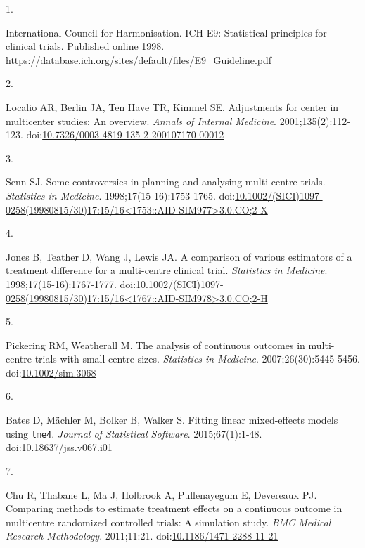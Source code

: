 \documentclass[
  11pt,
]{article}
\newlength{\cslhangindent}
\newlength{\csllabelwidth}
\newenvironment{CSLReferences}[2] %
 {\begin{list}{}{%
  \setlength{\itemindent}{0pt}
  \setlength{\leftmargin}{0pt}
  \setlength{\parsep}{0pt}
  \ifodd #1
   \setlength{\leftmargin}{\cslhangindent}
   \setlength{\itemindent}{-1\cslhangindent}
  \fi
  \setlength{\itemsep}{#2\baselineskip}}}
 {\end{list}}
\newcommand{\CSLLeftMargin}[1]{\parbox[t]{\csllabelwidth}{\strut#1\strut}}
\newcommand{\CSLRightInline}[1]{\parbox[t]{\linewidth - \csllabelwidth}{\strut#1\strut}}
\begin{document}
\protect{}\label{refs}
\begin{CSLReferences}{0}{1}
\CSLLeftMargin{1. }%
\CSLRightInline{International Council for Harmonisation. ICH {E9}: Statistical principles for clinical trials. Published online 1998. \url{https://database.ich.org/sites/default/files/E9_Guideline.pdf}}

\CSLLeftMargin{2. }%
\CSLRightInline{Localio AR, Berlin JA, Ten Have TR, Kimmel SE. Adjustments for center in multicenter studies: An overview. \emph{Annals of Internal Medicine}. 2001;135(2):112-123. doi:\href{https://doi.org/10.7326/0003-4819-135-2-200107170-00012}{10.7326/0003-4819-135-2-200107170-00012}}

\CSLLeftMargin{3. }%
\CSLRightInline{Senn SJ. Some controversies in planning and analysing multi-centre trials. \emph{Statistics in Medicine}. 1998;17(15-16):1753-1765. doi:\href{https://doi.org/10.1002/(SICI)1097-0258(19980815/30)17:15/16\%3C1753::AID-SIM977\%3E3.0.CO;2-X}{10.1002/(SICI)1097-0258(19980815/30)17:15/16\textless1753::AID-SIM977\textgreater3.0.CO;2-X}}

\CSLLeftMargin{4. }%
\CSLRightInline{Jones B, Teather D, Wang J, Lewis JA. A comparison of various estimators of a treatment difference for a multi-centre clinical trial. \emph{Statistics in Medicine}. 1998;17(15-16):1767-1777. doi:\href{https://doi.org/10.1002/(SICI)1097-0258(19980815/30)17:15/16\%3C1767::AID-SIM978\%3E3.0.CO;2-H}{10.1002/(SICI)1097-0258(19980815/30)17:15/16\textless1767::AID-SIM978\textgreater3.0.CO;2-H}}

\CSLLeftMargin{5. }%
\CSLRightInline{Pickering RM, Weatherall M. The analysis of continuous outcomes in multi-centre trials with small centre sizes. \emph{Statistics in Medicine}. 2007;26(30):5445-5456. doi:\href{https://doi.org/10.1002/sim.3068}{10.1002/sim.3068}}

\CSLLeftMargin{6. }%
\CSLRightInline{Bates D, Mächler M, Bolker B, Walker S. Fitting linear mixed-effects models using \texttt{lme4}. \emph{Journal of Statistical Software}. 2015;67(1):1-48. doi:\href{https://doi.org/10.18637/jss.v067.i01}{10.18637/jss.v067.i01}}

\CSLLeftMargin{7. }%
\CSLRightInline{Chu R, Thabane L, Ma J, Holbrook A, Pullenayegum E, Devereaux PJ. Comparing methods to estimate treatment effects on a continuous outcome in multicentre randomized controlled trials: A simulation study. \emph{BMC Medical Research Methodology}. 2011;11:21. doi:\href{https://doi.org/10.1186/1471-2288-11-21}{10.1186/1471-2288-11-21}}


\end{CSLReferences}
\end{document}
